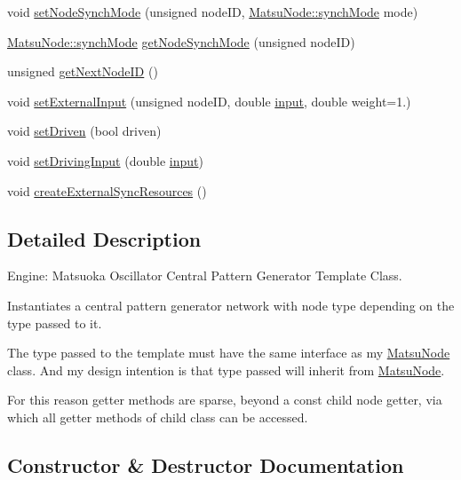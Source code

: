 \begin{DoxyCompactItemize}
void \mbox{\hyperlink{classCPG_ad237f2dc49f5340b056cff42100af751}{set\+Node\+Synch\+Mode}} (unsigned node\+ID, \mbox{\hyperlink{classMatsuNode_a725e228db39b8842f851ddf88f640bed}{Matsu\+Node\+::synch\+Mode}} mode)
\item 
\mbox{\hyperlink{classMatsuNode_a725e228db39b8842f851ddf88f640bed}{Matsu\+Node\+::synch\+Mode}} \mbox{\hyperlink{classCPG_a90390492d725a180160ee2743619fd27}{get\+Node\+Synch\+Mode}} (unsigned node\+ID)
\item 
unsigned \mbox{\hyperlink{classCPG_aa36545f77f1e3b6161bb00ff525ddc12}{get\+Next\+Node\+ID}} ()
\item 
void \mbox{\hyperlink{classCPG_add4b14085a01274b19b7a599d2f02af4}{set\+External\+Input}} (unsigned node\+ID, double \mbox{\hyperlink{structCPG_1_1input}{input}}, double weight=1.)
\item 
void \mbox{\hyperlink{classCPG_a71cc2187f75bf57bc050d95cce839812}{set\+Driven}} (bool driven)
\item 
void \mbox{\hyperlink{classCPG_a06766b4d48cbd149935513273dcaecb1}{set\+Driving\+Input}} (double \mbox{\hyperlink{structCPG_1_1input}{input}})
\item 
void \mbox{\hyperlink{classCPG_af934e459315109d3c206781bccef997b}{create\+External\+Sync\+Resources}} ()
\end{DoxyCompactItemize}


\subsection{Detailed Description}
Engine\+: Matsuoka Oscillator Central Pattern Generator Template Class. 

Instantiates a central pattern generator network with node type depending on the type passed to it.

The type passed to the template must have the same interface as my \mbox{\hyperlink{classMatsuNode}{Matsu\+Node}} class. And my design intention is that type passed will inherit from \mbox{\hyperlink{classMatsuNode}{Matsu\+Node}}.

For this reason getter methods are sparse, beyond a const child node getter, via which all getter methods of child class can be accessed. 

\subsection{Constructor \& Destructor Documentation}
\mbox{\label{classCPG_a53baf614a79f4178180be5d7120337d4}} 
